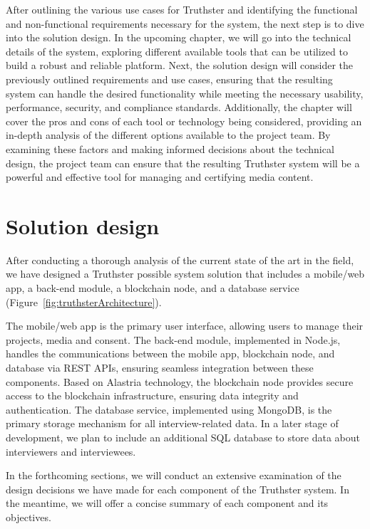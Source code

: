 \documentclass[target=mst,aauheader=]{thud}
\begin{document}
After outlining the various use cases for Truthster and identifying the functional and non-functional requirements necessary for the system, the next step is to dive into the solution design. In the upcoming chapter, we will go into the technical details of the system, exploring different available tools that can be utilized to build a robust and reliable platform. Next, the solution design will consider the previously outlined requirements and use cases, ensuring that the resulting system can handle the desired functionality while meeting the necessary usability, performance, security, and compliance standards. Additionally, the chapter will cover the pros and cons of each tool or technology being considered, providing an in-depth analysis of the different options available to the project team. By examining these factors and making informed decisions about the technical design, the project team can ensure that the resulting Truthster system will be a powerful and effective tool for managing and certifying media content.







\chapter{Solution design}
\label{chapter:solutionDesign}

After conducting a thorough analysis of the current state of the art in the field, we have designed a Truthster possible system solution that includes a mobile/web app, a back-end module, a blockchain node, and a database service (Figure~\ref{fig:truthsterArchitecture}).\par
The mobile/web app is the primary user interface, allowing users to manage their projects, media and consent. The back-end module, implemented in Node.js, handles the communications between the mobile app, blockchain node, and database via REST APIs, ensuring seamless integration between these components. Based on Alastria technology, the blockchain node provides secure access to the blockchain infrastructure, ensuring data integrity and authentication. The database service, implemented using MongoDB, is the primary storage mechanism for all interview-related data. In a later stage of development, we plan to include an additional SQL database to store data about interviewers and interviewees.\par
In the forthcoming sections, we will conduct an extensive examination of the design decisions we have made for each component of the Truthster system. In the meantime, we will offer a concise summary of each component and its objectives.
\end{document}
